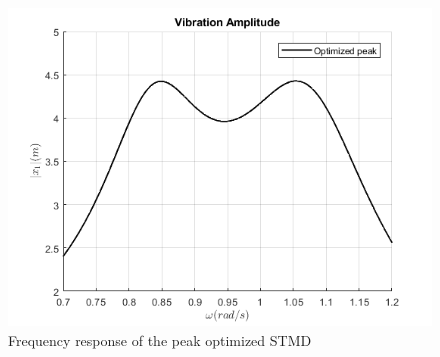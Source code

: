 \begin{figure}
    \centering
    \includegraphics[scale=0.5]{MATLAB Figures/peak_optmized_STMD.png}
    \caption{Frequency response of the peak optimized STMD}
    \label{fig:peak_opt_STMD}
\end{figure}